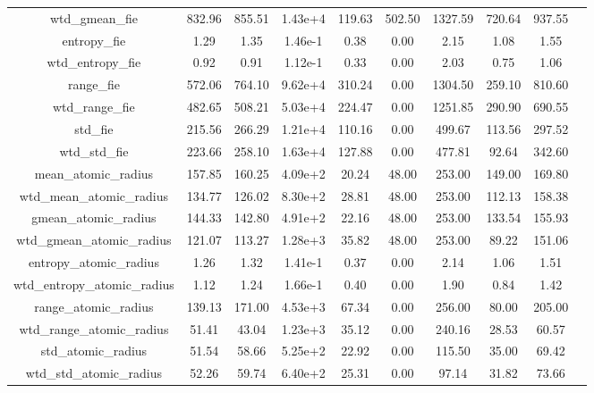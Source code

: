 \documentclass[11pt]{article}
\begin{document}
\begin{table}[H]
{\begin{tabular}{|c|c|c|c|c|c|c|c|c|c|}
wtd\_gmean\_fie                    &   832.96&   855.51&  1.43e+4&   119.63&  502.50&   1327.59&   720.64&   937.55 \\
entropy\_fie                      &     1.29&     1.35&  1.46e-1&     0.38&    0.00&      2.15&     1.08&     1.55 \\
wtd\_entropy\_fie                  &     0.92&     0.91&  1.12e-1&     0.33&    0.00&      2.03&     0.75&     1.06 \\
range\_fie                        &   572.06&   764.10&  9.62e+4&   310.24&    0.00&   1304.50&   259.10&   810.60 \\
wtd\_range\_fie                    &   482.65&   508.21&  5.03e+4&   224.47&    0.00&   1251.85&   290.90&   690.55 \\
std\_fie                          &   215.56&   266.29&  1.21e+4&   110.16&    0.00&    499.67&   113.56&   297.52 \\
wtd\_std\_fie                      &   223.66&   258.10&  1.63e+4&   127.88&    0.00&    477.81&    92.64&   342.60 \\
mean\_atomic\_radius               &   157.85&   160.25&  4.09e+2&    20.24&   48.00&    253.00&   149.00&   169.80 \\
wtd\_mean\_atomic\_radius           &   134.77&   126.02&  8.30e+2&    28.81&   48.00&    253.00&   112.13&   158.38 \\
gmean\_atomic\_radius              &   144.33&   142.80&  4.91e+2&    22.16&   48.00&    253.00&   133.54&   155.93 \\
wtd\_gmean\_atomic\_radius          &   121.07&   113.27&  1.28e+3&    35.82&   48.00&    253.00&    89.22&   151.06 \\
entropy\_atomic\_radius            &     1.26&     1.32&  1.41e-1&     0.37&    0.00&      2.14&     1.06&     1.51 \\
wtd\_entropy\_atomic\_radius        &     1.12&     1.24&  1.66e-1&     0.40&    0.00&      1.90&     0.84&     1.42 \\
range\_atomic\_radius              &   139.13&   171.00&  4.53e+3&    67.34&    0.00&    256.00&    80.00&   205.00 \\
wtd\_range\_atomic\_radius          &    51.41&    43.04&  1.23e+3&    35.12&    0.00&    240.16&    28.53&    60.57 \\
std\_atomic\_radius                &    51.54&    58.66&  5.25e+2&    22.92&    0.00&    115.50&    35.00&    69.42 \\
wtd\_std\_atomic\_radius            &    52.26&    59.74&  6.40e+2&    25.31&    0.00&     97.14&    31.82&    73.66 \\

\end{tabular}}
\end{table}
\end{document}
